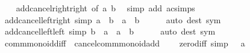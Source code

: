 \begin{isabellebody}
%
\isadelimproof
\ \ %
\endisadelimproof
%
\isatagproof
{}\isamarkupfalse%
\ add{\isacharunderscore}{\kern0pt}cancel{\isacharunderscore}{\kern0pt}right{\isacharunderscore}{\kern0pt}right\ {\isacharbrackleft}{\kern0pt}of\ a\ b{\isacharbrackright}{\kern0pt}\ \isamarkupfalse%
\ {\isacharparenleft}{\kern0pt}simp\ add{\isacharcolon}{\kern0pt}\ ac{\isacharunderscore}{\kern0pt}simps{\isacharparenright}{\kern0pt}%
\endisatagproof
{\isafoldproof}%
%
\isadelimproof
\isanewline
%
\endisadelimproof
\isanewline
{}\isamarkupfalse%
\ add{\isacharunderscore}{\kern0pt}cancel{\isacharunderscore}{\kern0pt}left{\isacharunderscore}{\kern0pt}right\ {\isacharbrackleft}{\kern0pt}simp{\isacharbrackright}{\kern0pt}{\isacharcolon}{\kern0pt}\ {\isachardoublequoteopen}a\ {\isacharplus}{\kern0pt}\ b\ {\isacharequal}{\kern0pt}\ a\ {\isasymlongleftrightarrow}\ b\ {\isacharequal}{\kern0pt}\ {}{\isachardoublequoteclose}\isanewline
%
\isadelimproof
\ \ %
\endisadelimproof
%
\isatagproof
{}\isamarkupfalse%
\ {\isacharparenleft}{\kern0pt}auto\ dest{\isacharcolon}{\kern0pt}\ sym{\isacharparenright}{\kern0pt}%
\endisatagproof
{\isafoldproof}%
%
\isadelimproof
\isanewline
%
\endisadelimproof
\isanewline
{}\isamarkupfalse%
\ add{\isacharunderscore}{\kern0pt}cancel{\isacharunderscore}{\kern0pt}left{\isacharunderscore}{\kern0pt}left\ {\isacharbrackleft}{\kern0pt}simp{\isacharbrackright}{\kern0pt}{\isacharcolon}{\kern0pt}\ {\isachardoublequoteopen}b\ {\isacharplus}{\kern0pt}\ a\ {\isacharequal}{\kern0pt}\ a\ {\isasymlongleftrightarrow}\ b\ {\isacharequal}{\kern0pt}\ {}{\isachardoublequoteclose}\isanewline
%
\isadelimproof
\ \ %
\endisadelimproof
%
\isatagproof
{}\isamarkupfalse%
\ {\isacharparenleft}{\kern0pt}auto\ dest{\isacharcolon}{\kern0pt}\ sym{\isacharparenright}{\kern0pt}%
\endisatagproof
{\isafoldproof}%
%
\isadelimproof
\isanewline
%
\endisadelimproof
\isanewline
{}\isamarkupfalse%
\isanewline
\isanewline
{}\isamarkupfalse%
\ comm{\isacharunderscore}{\kern0pt}monoid{\isacharunderscore}{\kern0pt}diff\ {\isacharequal}{\kern0pt}\ cancel{\isacharunderscore}{\kern0pt}comm{\isacharunderscore}{\kern0pt}monoid{\isacharunderscore}{\kern0pt}add\ {\isacharplus}{\kern0pt}\isanewline
\ \ \ zero{\isacharunderscore}{\kern0pt}diff\ {\isacharbrackleft}{\kern0pt}simp{\isacharbrackright}{\kern0pt}{\isacharcolon}{\kern0pt}\ {\isachardoublequoteopen}{}\ {\isacharminus}{\kern0pt}\ a\ {\isacharequal}{\kern0pt}\ {}{\isachardoublequoteclose}\isanewline

\end{isabellebody}
